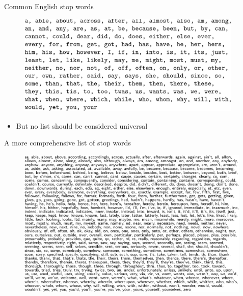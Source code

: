 \documentclass[english]{beamer}
\begin{document}
\begin{frame}{Common English stop words}
\begin{figure}[h]
\begin{centering}
\includegraphics[height=1.9in]{Images/fig9}
\end{centering}
\end{figure}
\begin{itemize}
    \item But no list should be considered universal
\end{itemize}
\end{frame}

\begin{frame}{A more comprehensive list of stop words}
\begin{figure}[h]
\begin{centering}
\includegraphics[height=2.8in]{Images/fig10}
\end{centering}
\end{figure}
\end{frame}
\end{document}
